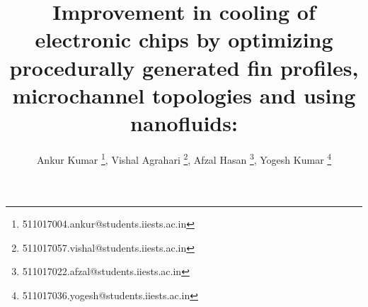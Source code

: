\documentclass[
	fontsize=12pt, %
	twoside=false, %
	numbers=noenddot, %
]{kaohandt}
\begin{document}
\title{
	Improvement in cooling of electronic chips
	by optimizing procedurally generated fin profiles, microchannel topologies and using nanofluids: \\
}
\author[ank]{
	Ankur Kumar \footnote{511017004.ankur@students.iiests.ac.in},
	Vishal Agrahari \footnote{511017057.vishal@students.iiests.ac.in},
	Afzal Hasan \footnote{511017022.afzal@students.iiests.ac.in},
	Yogesh Kumar \footnote{511017036.yogesh@students.iiests.ac.in}
}

\maketitle

\renewcommand{\theequation}{Eq \arabic{equation}}



% 



\end{document}
